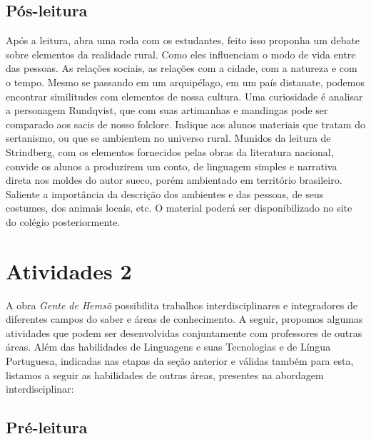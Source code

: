 \documentclass[12pt]{extarticle}
\begin{document}
\subsection{Pós-leitura}


Após a leitura, abra uma roda com os estudantes, feito isso
proponha um debate sobre elementos da realidade rural. Como eles
influenciam o modo de vida entre das pessoas. As relações sociais, as
relações com a cidade, com a natureza e com o tempo. Mesmo se passando
em um arquipélago, em um país distanate, podemos encontrar similitudes
com elementos de nossa cultura. Uma curiosidade é analisar a personagem
Rundqvist, que com suas artimanhas e mandingas pode ser comparado aos
sacis de nosso folclore. Indique aos alunos materiais que tratam do
sertanismo, ou que se ambientem no universo rural. Munidos da leitura de
Strindberg, com os elementos fornecidos pelas obras da literatura
nacional, convide os alunos a produzirem um conto, de linguagem simples
e narrativa direta nos moldes do autor sueco, porém ambientado em
território brasileiro. Saliente a importância da descrição dos ambientes
e das pessoas, de seus costumes, dos animais locais, etc. O material
poderá ser disponibilizado no site do colégio posteriormente.

\section{Atividades 2}


A obra \emph{Gente de Hemsö} possibilita trabalhos interdisciplinares e
integradores de diferentes campos do saber e áreas de conhecimento. A
seguir, propomos algumas atividades que podem ser desenvolvidas
conjuntamente com professores de outras áreas. Além das habilidades de
Linguagens e suas Tecnologias e de Língua Portuguesa, indicadas nas
etapas da seção anterior e válidas também para esta, listamos a seguir
as habilidades de outras áreas, presentes na abordagem interdisciplinar:

\subsection{Pré-leitura}
\end{document}
